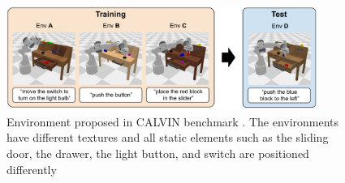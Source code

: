 \begin{figure}[t]
    \centering
    \includegraphics[width=0.9\textwidth]{figures/images/calvin/calvin_env.png}
    \caption{Environment proposed in CALVIN benchmark \cite{calvin}. The environments have different textures and all static elements such as the sliding door, the drawer, the light button, and switch are positioned differently}
    \label{fig:calvin_env}
\end{figure}